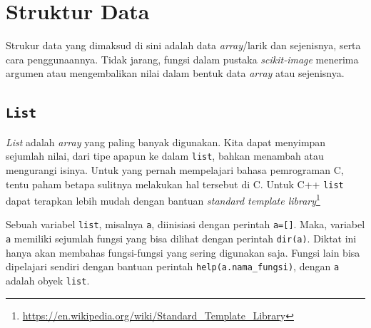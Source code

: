 \section{Struktur Data}
Strukur data yang dimaksud di sini adalah data \textit{array}/larik dan sejenisnya, serta cara penggunaannya. Tidak jarang, fungsi dalam pustaka \textit{scikit-image} menerima argumen atau mengembalikan nilai dalam bentuk data \textit{array} atau sejenisnya. 
\subsection{\texttt{List}}
\textit{List} adalah \textit{array} yang paling banyak digunakan. Kita dapat menyimpan sejumlah nilai, dari tipe apapun ke dalam \texttt{list}, bahkan menambah atau mengurangi isinya. Untuk yang pernah mempelajari bahasa pemrograman C, tentu paham betapa sulitnya melakukan hal tersebut di C. Untuk C++ \texttt{list} dapat terapkan lebih mudah dengan bantuan \textit{standard template library}\footnote{\url{https://en.wikipedia.org/wiki/Standard\_Template\_Library}}

Sebuah variabel \texttt{list}, misalnya \texttt{a}, diinisiasi dengan perintah \texttt{a=[]}. Maka, variabel \texttt{a} memiliki sejumlah fungsi yang bisa dilihat dengan perintah \texttt{dir(a)}. Diktat ini hanya akan membahas fungsi-fungsi yang sering digunakan saja. Fungsi lain bisa dipelajari sendiri dengan bantuan perintah \texttt{help(a.nama\_fungsi)}, dengan \texttt{a} adalah obyek \texttt{list}.

